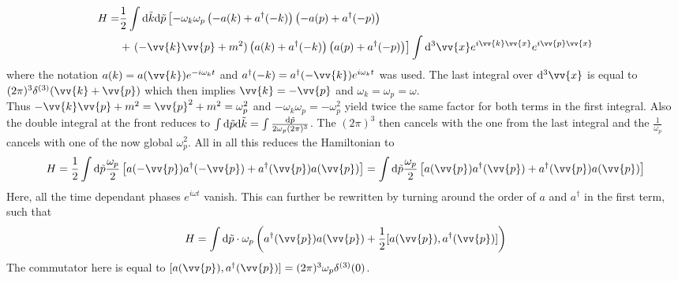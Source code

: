 \documentclass{include/thesisclass}
\newcommand{\cc}{\cdot}
\newcommand{\vx}{\vv{x}}
\newcommand{\vp}{\vv{p}}
\newcommand{\dd}{{\rm d}}
\begin{document}
\begin{align*}
H =& \frac{1}{2} \int \dd \tilde{k} \dd \tilde{p} \left[ - \omega_k \omega_p \left( - a(k) + a^\dagger(-k) \right)\left( -a(p) + a^\dagger(-p)\right) \right. \\
&+ \left. ( - \vv{k} \vp + m^2) \left( a(k) + a^\dagger(-k) \right) \left( a(p) + a^\dagger(-p)\right)\right] \int \dd^3 \vx e^{i \vv{k} \vx}e^{i \vp \vx}
\end{align*}
where the notation $a(k) = a(\vv{k})e^{-i\omega_kt}$ and $a^\dagger(-k) = a^\dagger(-\vv{k})e^{i\omega_kt}$ was used. The last integral over $\dd^3 \vx$ is equal to $(2\pi)^3 \delta^{(3)}(\vv{k} + \vp)$ which then implies $\vv{k} = - \vp$ and $\omega_k = \omega_p = \omega$.\\
Thus $-\vv{k}\vp + m^2 =  \vp^2 + m^2 = \omega_p^2$ and $-\omega_k \omega_p = -\omega_p^2$ yield twice the same factor for both terms in the first integral. Also the double integral at the front reduces to $\int \dd\tilde{p}\dd\tilde{k} = \int \frac{\dd\tilde{p}}{2 \omega_p (2\pi)^3}$. The $(2\pi)^3$ then cancels with the one from the last integral and the $\frac{1}{\omega_p}$ cancels with one of the now global $\omega_p^2$. All in all this reduces the Hamiltonian to
\[H = \frac{1}{2} \int \dd\tilde{p} \frac{\omega_p}{2} \left[ a(-\vp)a^\dagger(-\vp) + a^\dagger(\vp)a(\vp)\right] = \int \dd \tilde{p} \frac{\omega_p}{2} \left[a(\vp) a^\dagger(\vp) + a^\dagger(\vp) a(\vp) \right]\]
Here, all the time dependant phases $e^{i\omega t}$ vanish. This can further be rewritten by turning around the order of $a$ and $a^\dagger$ in the first term, such that
\[H = \int \dd \tilde{p} \cc\omega_p \left( a^\dagger(\vp) a(\vp) + \frac{1}{2}[ a(\vp), a^\dagger(\vp) ] \right)\]
The commutator here is equal to $[a(\vp), a^\dagger(\vp)] = (2\pi)^3 \omega_p \delta^{(3)}(0)$.
\end{document}
